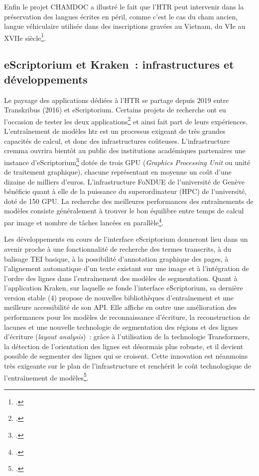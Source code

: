 \documentclass[a4paper,12pt,twoside]{book}
\begin{document}
				Enfin le projet CHAMDOC a illustré le fait que l'HTR peut intervenir
				dans la préservation des langues écrites en péril, comme c'est le cas du
				cham ancien, langue véhiculaire utilisée dans des inscriptions gravées
				au Vietnam, du VIe au XVIIe siècle\footcite{schweyerAnalyseReconnaissanceIndexation2022}.
		
			\subsection{eScriptorium et Kraken~: infrastructures et développements}
			
				Le paysage des applications dédiées à l'HTR se partage depuis 2019 entre
				Transkribus (2016) et eScriptorium. Certains projets de recherche ont eu
				l'occasion de tester les deux applications\footcite{leblancTranskribusEScriptoriumRetour2022, paupeCursiveXVIIeSiecle2022} et ainsi fait part de leurs
				expériences. L'entraînement de modèles \gls{htr} est un processus exigeant de
				très grandes capacités de calcul, et donc des infrastructures coûteuses.
				L'infrastructure \gls{cremma} ouvrira bientôt au public des institutions
				académiques partenaires une instance d'eScriptorium\footcite{marguin-hamonDiscoursOuverturePresentation2022} dotée de trois GPU
				(\textit{Graphics Processing Unit} ou unité de traitement graphique),
				chacune représentant en moyenne un coût d'une dizaine de milliers
				d'euros. L'infrastructure FoNDUE de l'université de Genève bénéficie
				quant à elle de la puissance du superordinateur (HPC) de l'université,
				doté de 150 GPU. La recherche des meilleures performances des
				entraînements de modèles consiste généralement à trouver le bon
				équilibre entre temps de calcul par image et nombre de tâches lancées en
				parallèle\footcite{gabayFoNDUELightweightHTR2022}.
				
				Les développements en cours de l'interface eScriptorium donneront lieu
				dans un avenir proche à une fonctionnalité de recherche des termes
				transcrits, à du balisage TEI basique, à la possibilité d'annotation
				graphique des pages, à l'alignement automatique d'un texte existant sur
				une image et à l'intégration de l'ordre des lignes dans l'entraînement
				des modèles de {segmentation}. Quant à l'application Kraken, sur laquelle
				se fonde l'interface eScriptorium, sa dernière version stable (4)
				propose de nouvelles bibliothèques d'entraînement et une meilleure
				accessibilité de son API. Elle affiche en outre une amélioration des
				performances pour les modèles de reconnaissance d'écriture, la
				reconstruction de lacunes et une nouvelle technologie de {segmentation}
				des régions et des lignes d'écriture (\textit{layout analysis})~: grâce à
				l'utilisation de la technologie Transformers, la détection de
				l'orientation des lignes est désormais plus robuste, et il devient
				possible de segmenter des lignes qui se croisent. Cette innovation est
				néanmoins très exigeante sur le plan de l'infrastructure et renchérit le
				coût technologique de l'entraînement de modèles\footcite{kiesslingNewDevelopmentsKraken2022}.
		
\end{document}
